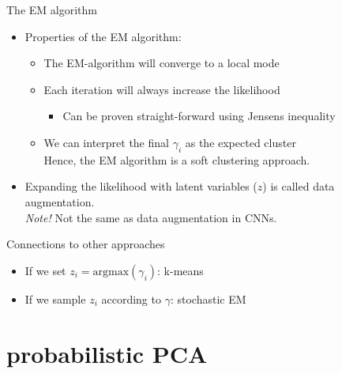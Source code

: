 \documentclass[10pt]{beamer}
\begin{document}
\begin{frame}{The EM algorithm}

\begin{itemize}
\item Properties of the EM algorithm:
\begin{itemize}
\item The EM-algorithm will converge to a {\color{uured} local mode}\pause
\item Each iteration will {\color{uured} always} increase the likelihood
\begin{itemize}
\item Can be proven straight-forward using Jensens inequality%
\end{itemize}
\pause
\item We can interpret the final $\gamma_i$ as the {\color{uured} expected cluster}\\
Hence, the EM algorithm is a {\color{uured} soft clustering} approach.
\end{itemize}
\item Expanding the likelihood with latent variables ($z$) is called {\color{uured} data augmentation}.
\\ \emph{Note!} Not the same as data augmentation in CNNs.
\end{itemize}

\end{frame}


\begin{frame}{Connections to other approaches}

\begin{itemize}
\item If we set $z_i = \text{argmax}(\gamma_i)$: {\color{uured} k-means}\pause
\item If we sample $z_i$ according to $\gamma$: {\color{uured} stochastic EM}
\end{itemize}

\end{frame}

\section{probabilistic PCA}
\end{document}
